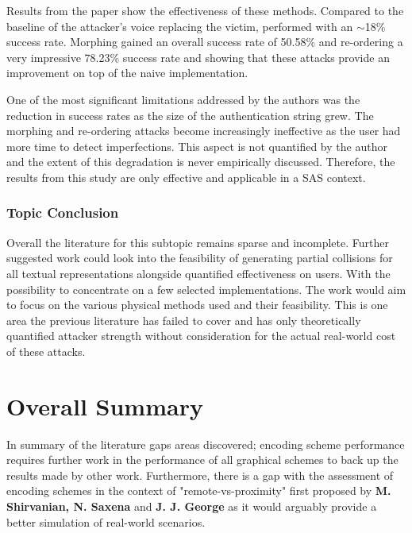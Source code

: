 Results from the paper show the effectiveness of these 
methods. Compared to the baseline of the attacker's voice 
replacing the victim, performed with an $\sim$18\% success rate. Morphing gained an overall success rate of 50.58\% and re-ordering a very impressive 78.23\% success rate and showing that these attacks provide an improvement on top of the naive implementation.

One of the most significant limitations addressed by the authors  was the reduction in success rates as the size of the authentication string grew. The morphing and re-ordering  attacks become increasingly ineffective as the user had more time to detect imperfections. This aspect is not quantified by the author and the extent of this degradation is never empirically discussed. Therefore, the results from this study are only effective and applicable in a SAS context.

\subsubsection*{Topic Conclusion}
Overall the literature for this subtopic remains sparse and incomplete. Further suggested work could look into the feasibility of generating partial collisions for all textual representations alongside quantified effectiveness on users. With the possibility to concentrate on a few selected implementations. The work would aim to focus on the various physical methods used and their feasibility. This is one area the previous literature has failed to cover and has only theoretically quantified attacker strength without consideration for the actual real-world cost of these attacks.

\section{Overall Summary}
In summary of the literature gaps areas discovered; encoding scheme performance requires further work in the performance of all graphical schemes to back up the results made by other work. Furthermore, there is a gap with the assessment of encoding schemes in the context of "remote-vs-proximity" first proposed by \textbf{M. Shirvanian, N. Saxena} and \textbf{J. J. George}\cite{shirvanian2017pitfalls} as it would arguably provide a better simulation of real-world scenarios.

